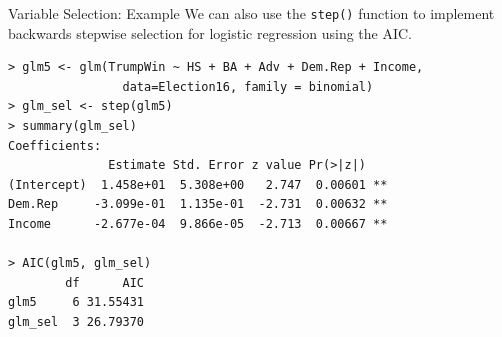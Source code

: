\documentclass[10pt]{beamer}\usepackage[]{graphicx}\usepackage[]{color}
\begin{document}
\begin{frame}[fragile]{Variable Selection: Example}
We can also use the \texttt{step()} function to implement backwards stepwise selection for logistic regression using the AIC.
\small
\begin{verbatim}
> glm5 <- glm(TrumpWin ~ HS + BA + Adv + Dem.Rep + Income, 
                data=Election16, family = binomial)
> glm_sel <- step(glm5)
> summary(glm_sel)
Coefficients:
              Estimate Std. Error z value Pr(>|z|)   
(Intercept)  1.458e+01  5.308e+00   2.747  0.00601 **
Dem.Rep     -3.099e-01  1.135e-01  -2.731  0.00632 **
Income      -2.677e-04  9.866e-05  -2.713  0.00667 **

> AIC(glm5, glm_sel)
        df      AIC
glm5     6 31.55431
glm_sel  3 26.79370
\end{verbatim}
\normalsize
\end{frame}
\end{document}
